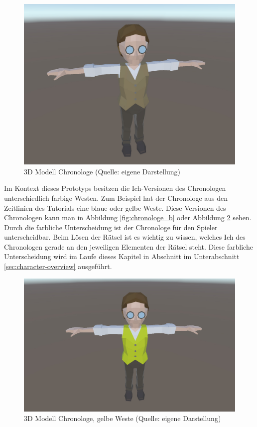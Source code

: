 \begin{figure}[ht]
\centering
\includegraphics[width=0.8\linewidth]{content/pictures/Chronologe.jpg}
\caption{3D Modell Chronologe (Quelle: eigene Darstellung)}
\label{fig:chronologe}
\end{figure}

Im Kontext dieses Prototyps besitzen die Ich-Versionen des Chronologen unterschiedlich farbige Westen. Zum Beispiel hat der Chronologe aus den Zeitlinien des Tutorials eine blaue oder gelbe Weste. Diese Versionen des Chronologen kann man in Abbildung \ref{fig:chronologe_b} oder Abbildung \ref{fig:chronologe_y} sehen. Durch die farbliche Unterscheidung ist der Chronologe für den Spieler unterscheidbar. Beim Lösen der Rätsel ist es wichtig zu wissen, welches Ich des Chronologen gerade an den jeweiligen Elementen der Rätsel steht. Diese farbliche Unterscheidung wird im Laufe dieses Kapitel in Abschnitt  im Unterabschnitt \ref{sec:character-overview}  ausgeführt.

\begin{figure}[ht]
\centering
\includegraphics[width=0.8\linewidth]{content/pictures/Chronologe_y.jpg}
\caption{3D Modell Chronologe, gelbe Weste (Quelle: eigene Darstellung)}
\label{fig:chronologe_y}
\end{figure}

